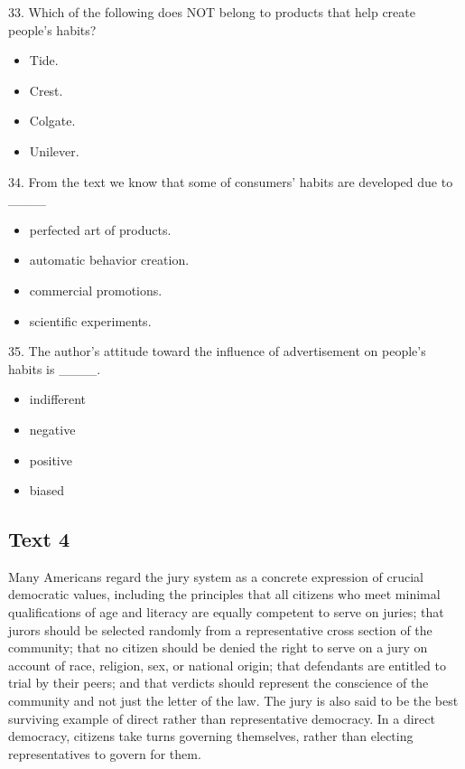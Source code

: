 \documentclass[UTF8,11pt]{ctexart}
\begin{document}
33. Which of the following does NOT belong to products that help create people’s habits?


\begin{itemize}[leftmargin=2em,itemsep=.2em,topsep=.4em]\item[A.] Tide.
\item[B.] Crest.
\item[C.] Colgate.
\item[D.] Unilever.
\end{itemize}

34. From the text we know that some of consumers’ habits are developed due to \_\_\_\_


\begin{itemize}[leftmargin=2em,itemsep=.2em,topsep=.4em]\item[A.] perfected art of products.
\item[B.] automatic behavior creation.
\item[C.] commercial promotions.
\item[D.] scientific experiments.
\end{itemize}

35. The author’s attitude toward the influence of advertisement on people’s habits is \_\_\_\_.


\begin{itemize}[leftmargin=2em,itemsep=.2em,topsep=.4em]\item[A.] indifferent
\item[B.] negative
\item[C.] positive
\item[D.] biased
\end{itemize}

\subsection*{\textbf{Text 4}}


Many Americans regard the jury system as a concrete expression of crucial democratic values, including the principles that all citizens who meet minimal qualifications of age and literacy are equally competent to serve on juries; that jurors should be selected randomly from a representative cross section of the community; that no citizen should be denied the right to serve on a jury on account of race, religion, sex, or national origin; that defendants are entitled to trial by their peers; and that verdicts should represent the conscience of the community and not just the letter of the law. The jury is also said to be the best surviving example of direct rather than representative democracy. In a direct democracy, citizens take turns governing themselves, rather than electing representatives to govern for them.
\end{document}
